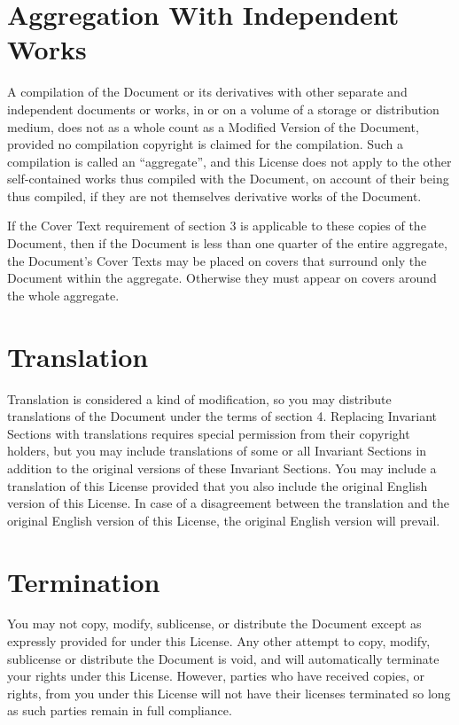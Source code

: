 \documentclass[oneside,a4paper]{book}
\begin{document}
\section{Aggregation With Independent Works}

A compilation of the Document or its derivatives with other separate
and independent documents or works, in or on a volume of a storage or
distribution medium, does not as a whole count as a Modified Version
of the Document, provided no compilation copyright is claimed for the
compilation.  Such a compilation is called an ``aggregate'', and this
License does not apply to the other self-contained works thus compiled
with the Document, on account of their being thus compiled, if they
are not themselves derivative works of the Document.

If the Cover Text requirement of section 3 is applicable to these
copies of the Document, then if the Document is less than one quarter
of the entire aggregate, the Document's Cover Texts may be placed on
covers that surround only the Document within the aggregate.
Otherwise they must appear on covers around the whole aggregate.


\section{Translation}

Translation is considered a kind of modification, so you may
distribute translations of the Document under the terms of section 4.
Replacing Invariant Sections with translations requires special
permission from their copyright holders, but you may include
translations of some or all Invariant Sections in addition to the
original versions of these Invariant Sections.  You may include a
translation of this License provided that you also include the
original English version of this License.  In case of a disagreement
between the translation and the original English version of this
License, the original English version will prevail.


\section{Termination}

You may not copy, modify, sublicense, or distribute the Document except
as expressly provided for under this License.  Any other attempt to
copy, modify, sublicense or distribute the Document is void, and will
automatically terminate your rights under this License.  However,
parties who have received copies, or rights, from you under this
License will not have their licenses terminated so long as such
parties remain in full compliance.
\end{document}

